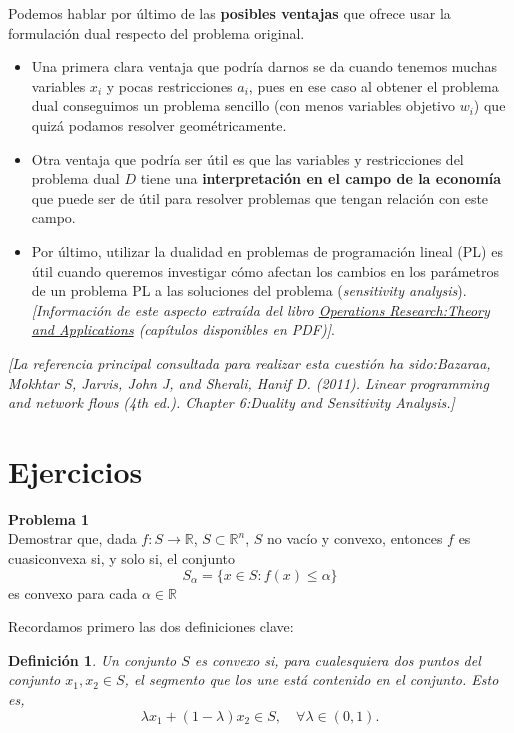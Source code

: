 \documentclass[a4paper]{article}
\newenvironment{problem}[2][Problema]
    { \begin{mdframed}[backgroundcolor=gray!20] \textbf{#1 #2} \\}
    {  \end{mdframed}}
\newcommand{\R}{\mathbb R}
\newtheorem{ndef}{Definición}
\begin{document}
Podemos hablar por último de las \textbf{posibles ventajas} que ofrece usar la formulación dual respecto del problema original.

\begin{itemize}

\item Una primera clara ventaja que podría darnos se da cuando tenemos muchas variables \(x_i\) y pocas restricciones \(a_i\), pues en ese caso al obtener el problema dual conseguimos un problema sencillo (con menos variables objetivo \(w_i\)) que quizá podamos resolver geométricamente.

\item Otra ventaja que podría ser útil es que las variables y restricciones del problema dual \(D\) tiene una \textbf{interpretación en el campo de la economía} que puede ser de útil para resolver problemas que tengan relación con este campo.

\item Por último, utilizar la dualidad en problemas de programación lineal (PL) es útil cuando queremos investigar cómo afectan los cambios en los parámetros de un problema PL a las soluciones del problema (\emph{sensitivity analysis}).\\
\emph{[Información de este aspecto extraída del libro \href{https://books.google.es/books?id=1EZxJHO32swC}{Operations Research:Theory and Applications} (capítulos disponibles en PDF)]}.
\end{itemize}

\emph{[La referencia principal consultada para realizar esta cuestión ha sido:Bazaraa, Mokhtar S, Jarvis, John J, and Sherali, Hanif D. (2011). Linear programming and
network flows (4th ed.). Chapter 6:Duality and Sensitivity Analysis.]}


\newpage

\section{Ejercicios}

\begin{problem}{1}
Demostrar que, dada \(f:S\to \R\), \(S\subset \R^n\), \(S\) no vacío y convexo, entonces \(f\) es cuasiconvexa si, y solo si, el conjunto
\[
S_\alpha = \{x \in S: f(x) \leq \alpha\}
\]
es convexo para cada \(\alpha \in \R\)
\end{problem}

Recordamos primero las dos definiciones clave:

\begin{ndef}
  Un conjunto \(S\) es convexo si, para cualesquiera dos puntos del conjunto \(x_{1},x_{2} \in S\), el segmento que los une está contenido en el conjunto. Esto es,
  \[
    \lambda x_{1} + (1-\lambda)x_{2} \in S, \quad \forall \lambda \in (0,1).
  \]
\end{ndef}
\end{document}
